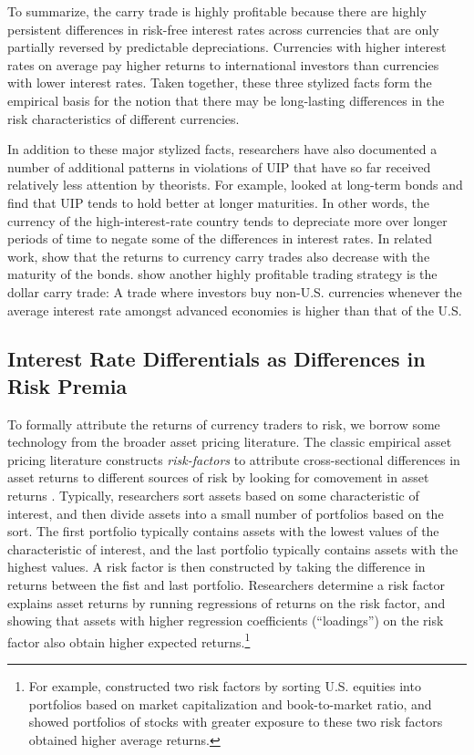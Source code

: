 \documentclass{ar-1col}
\begin{document}
To summarize, the carry trade is highly profitable because there are highly persistent differences in risk-free interest rates across currencies that are only partially reversed by predictable depreciations. Currencies with higher interest rates on average pay higher returns to international investors than currencies with lower interest rates. Taken together, these three stylized facts form the empirical basis for the notion that there may be long-lasting differences in the risk characteristics of different currencies.

In addition to these major stylized facts, researchers have also documented a number of additional patterns in violations of UIP that have so far received relatively less attention by theorists. For example, \citet{ChinnMeredith2004} looked at long-term bonds and find that UIP tends to hold better at longer maturities. In other words, the currency of the high-interest-rate country tends to depreciate more over longer periods of time to negate some of the differences in interest rates. In related work, \citet{LustigStathopoulosVerdelhan2019} show that the returns to currency carry trades also decrease with the maturity of the bonds. \citet{LRV2014} show another highly profitable trading strategy is the dollar carry trade: A trade where investors buy non-U.S. currencies whenever the average interest rate amongst advanced economies is higher than that of the U.S. 


\subsection{Interest Rate Differentials as Differences in Risk Premia \label{sec_RP}}


To formally attribute the returns of currency traders to risk, we borrow some technology from the broader asset pricing literature. The classic empirical asset pricing literature constructs \emph{risk-factors} to attribute cross-sectional differences in asset returns to different sources of risk by looking for comovement in asset returns \citep{Fama1976}. Typically, researchers sort assets based on some characteristic of interest, and then divide assets into a small number of portfolios based on the sort. The first portfolio typically contains assets with the lowest values of the characteristic of interest, and the last portfolio typically contains assets with the highest values. A risk factor is then constructed by taking the difference in returns between the fist and last portfolio. Researchers determine a risk factor explains asset returns by running regressions of returns on the risk factor, and showing that assets with higher regression coefficients (``loadings'') on the risk factor also obtain higher expected returns.\footnote{For example, \citet{FamaFrench1992} constructed two risk factors by sorting U.S. equities into portfolios based on market capitalization and book-to-market ratio, and showed portfolios of stocks with greater exposure to these two risk factors obtained higher average returns.}
\end{document}

